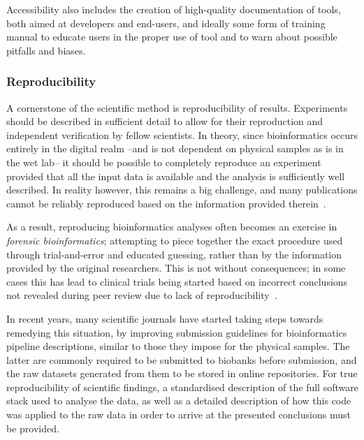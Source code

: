 \begin{justify}
Accessibility also includes the creation of high-quality documentation of tools, both aimed at developers and end-users, and ideally some form of training manual to educate users in the proper use of tool and to warn about possible pitfalls and biases.

\subsubsection{Reproducibility}

A cornerstone of the scientific method is reproducibility of results. Experiments should be described in sufficient detail to allow for their reproduction and independent verification by fellow scientists. In theory, since bioinformatics occurs entirely in the digital realm --and is not dependent on physical samples as is in the wet lab-- it should be possible to completely reproduce an experiment provided that all the input data is available and the analysis is sufficiently well described. In reality however, this remains a big challenge, and many publications cannot be reliably reproduced based on the information provided therein~\cite{baggerly2009reproducible,kim2018reproducibility}.

As a result, reproducing bioinformatics analyses often becomes an exercise in \textit{forensic bioinformatics}; attempting to piece together the exact procedure used through trial-and-error and educated guessing, rather than by the information provided by the original researchers.
This is not without consequences; in some cases this has lead to clinical trials being started based on incorrect conclusions not revealed during peer review due to lack of reproducibility~\cite{baggerly2009reproducible}.

In recent years, many scientific journals have started taking steps towards remedying this situation, by improving submission guidelines for bioinformatics pipeline descriptions, similar to those they impose for the physical samples.
The latter are commonly required to be submitted to biobanks before submission, and the raw datasets generated from them to be stored in online repositories.
For true reproducibility of scientific findings, a standardised description of the full software stack used to analyse the data, as well as a detailed description of how this code was applied to the raw data in order to arrive at the presented conclusions must be provided.

\end{justify}
